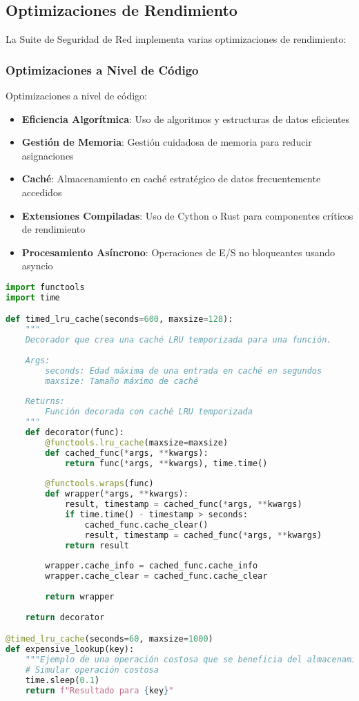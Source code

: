 \subsection{Optimizaciones de Rendimiento}
La Suite de Seguridad de Red implementa varias optimizaciones de rendimiento:

\subsubsection{Optimizaciones a Nivel de Código}
Optimizaciones a nivel de código:

\begin{itemize}
    \item \textbf{Eficiencia Algorítmica}: Uso de algoritmos y estructuras de datos eficientes
    \item \textbf{Gestión de Memoria}: Gestión cuidadosa de memoria para reducir asignaciones
    \item \textbf{Caché}: Almacenamiento en caché estratégico de datos frecuentemente accedidos
    \item \textbf{Extensiones Compiladas}: Uso de Cython o Rust para componentes críticos de rendimiento
    \item \textbf{Procesamiento Asíncrono}: Operaciones de E/S no bloqueantes usando asyncio
\end{itemize}

\begin{lstlisting}[language=python, caption=Ejemplo de Caché]
import functools
import time

def timed_lru_cache(seconds=600, maxsize=128):
    """
    Decorador que crea una caché LRU temporizada para una función.
    
    Args:
        seconds: Edad máxima de una entrada en caché en segundos
        maxsize: Tamaño máximo de caché
        
    Returns:
        Función decorada con caché LRU temporizada
    """
    def decorator(func):
        @functools.lru_cache(maxsize=maxsize)
        def cached_func(*args, **kwargs):
            return func(*args, **kwargs), time.time()
            
        @functools.wraps(func)
        def wrapper(*args, **kwargs):
            result, timestamp = cached_func(*args, **kwargs)
            if time.time() - timestamp > seconds:
                cached_func.cache_clear()
                result, timestamp = cached_func(*args, **kwargs)
            return result
            
        wrapper.cache_info = cached_func.cache_info
        wrapper.cache_clear = cached_func.cache_clear
        
        return wrapper
        
    return decorator

@timed_lru_cache(seconds=60, maxsize=1000)
def expensive_lookup(key):
    """Ejemplo de una operación costosa que se beneficia del almacenamiento en caché."""
    # Simular operación costosa
    time.sleep(0.1)
    return f"Resultado para {key}"
\end{lstlisting}

